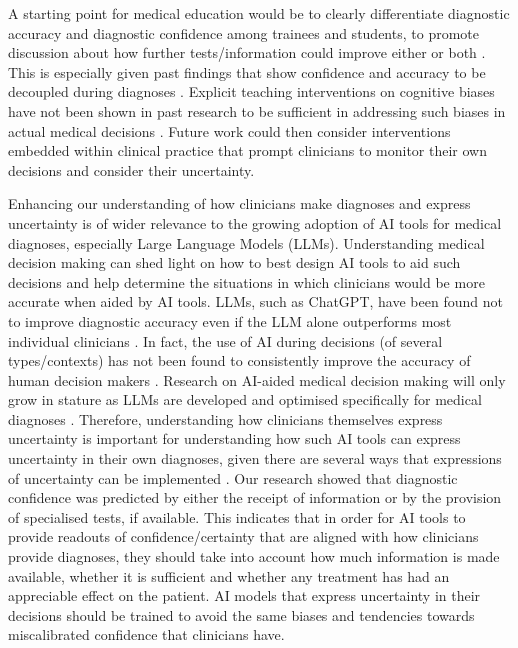 \documentclass[a4paper, nobind]{templates/ociamthesis}
\begin{document}
A starting point for medical education would be to clearly differentiate diagnostic accuracy and diagnostic confidence among trainees and students, to promote discussion about how further tests/information could improve either or both \autocite{santhosh_diagnostic_2019}. This is especially given past findings that show confidence and accuracy to be decoupled during diagnoses \autocite{friedman_are_2001,yang_effect_2012,meyer_physicians_2013,garbayo_metacognitive_2023}. Explicit teaching interventions on cognitive biases have not been shown in past research to be sufficient in addressing such biases in actual medical decisions \autocite{fraundorf_cognitive_2023}. Future work could then consider interventions embedded within clinical practice that prompt clinicians to monitor their own decisions and consider their uncertainty.

Enhancing our understanding of how clinicians make diagnoses and express uncertainty is of wider relevance to the growing adoption of AI tools for medical diagnoses, especially Large Language Models (LLMs). Understanding medical decision making can shed light on how to best design AI tools to aid such decisions and help determine the situations in which clinicians would be more accurate when aided by AI tools. LLMs, such as ChatGPT, have been found not to improve diagnostic accuracy even if the LLM alone outperforms most individual clinicians \autocite{goh_large_2024}. In fact, the use of AI during decisions (of several types/contexts) has not been found to consistently improve the accuracy of human decision makers \autocite{vaccaro_when_2024}. Research on AI-aided medical decision making will only grow in stature as LLMs are developed and optimised specifically for medical diagnoses \autocite{mcduff_towards_2023}. Therefore, understanding how clinicians themselves express uncertainty is important for understanding how such AI tools can express uncertainty in their own diagnoses, given there are several ways that expressions of uncertainty can be implemented \autocite{savage_large_2025}. Our research showed that diagnostic confidence was predicted by either the receipt of information or by the provision of specialised tests, if available. This indicates that in order for AI tools to provide readouts of confidence/certainty that are aligned with how clinicians provide diagnoses, they should take into account how much information is made available, whether it is sufficient and whether any treatment has had an appreciable effect on the patient. AI models that express uncertainty in their decisions should be trained to avoid the same biases and tendencies towards miscalibrated confidence that clinicians have.
\end{document}
